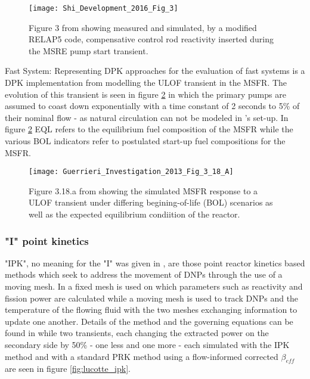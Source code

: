 \documentclass[review]{elsarticle}
\begin{document}
\begin{figure}[h]
   \centering
   \texttt{[image: Shi\_Development\_2016\_Fig\_3]}
   \caption{Figure 3 from \cite{shi_development_2016} showing measured and simulated, by a modified
   RELAP5 code, compensative control rod reactivity inserted during the MSRE pump start
   transient.} 
   \label{fig:shi_msre_ps}
\end{figure}

\par Fast System: Representing DPK approaches for the evaluation of fast
systems is a DPK implementation from \cite{guerrieri_investigation_2013}
modelling the ULOF transient in the MSFR. The evolution of this transient is
seen in figure \ref{fig:guerrieri_msfr_ulof} in which the primary pumps are
assumed to coast down exponentially with a time constant of 2 seconds to 5\%
 of their nominal flow - as natural circulation can not be modeled in
\cite{guerrieri_investigation_2013}'s set-up. In figure 
\ref{fig:guerrieri_msfr_ulof} 
EQL refers to the equilibrium fuel composition of the
MSFR while the various BOL indicators refer to postulated start-up fuel
compositions for the MSFR. 

\begin{figure}[h]
   \centering
   \texttt{[image: Guerrieri\_Investigation\_2013\_Fig\_3\_18\_A]}
   \caption{Figure 3.18.a from \cite{guerrieri_investigation_2013} showing the simulated MSFR
   response to a ULOF transient under differing begining-of-life (BOL) scenarios as well as the
   expected equilibrium condiition of the reactor.} 
   \label{fig:guerrieri_msfr_ulof}
\end{figure}


\subsubsection{"I" point kinetics} \label{sssec:spk}
"IPK", no meaning for the "I" was given in \cite{merle-lucotte_physical_2015},
are those point reactor kinetics based methods which seek to address the
movement of DNPs through the use of a moving mesh. In
\cite{merle-lucotte_physical_2015} a fixed mesh is used on which parameters
such as reactivity and fission power are calculated while a moving mesh is
used to track DNPs and the temperature of the flowing fluid with the two
meshes exchanging information to update one another. Details of the method and
the governing equations can be found in \cite{merle-lucotte_physical_2015} while
two transients, each changing the extracted power on the secondary side by
50\% - one less and one more - each simulated with the IPK method and with a
standard PRK method using a flow-informed corrected $\beta_{eff}$ are seen
in figure \ref{fig:lucotte_ipk}.
\end{document}
